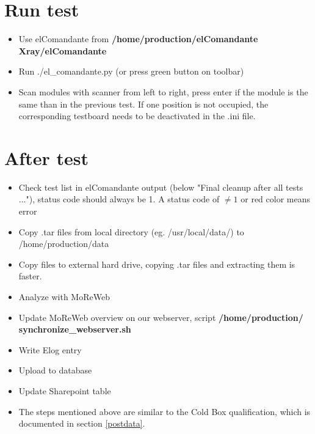 \documentclass[fleqn,10pt]{SelfArx} %
\newcommand{\shellcmd}[1]{\\\indent\indent\texttt{\footnotesize\$ #1}\\}
\begin{document}


\section{Run test}

\begin{itemize}
\item Use elComandante from \textbf{/home/production/elComandante{\color{Red} Xray}/elComandante}
\item Run ./el\_comandante.py (or press green button on toolbar)
\item Scan modules with scanner from left to right, press enter if the module is the same than in the previous test. If one position is not occupied, the corresponding testboard needs to be deactivated in the .ini file.
\end{itemize}


\section{After test}

\begin{itemize}
\item Check test list in elComandante output (below "Final cleanup after all tests ..."), status code should always be 1. A status code of $\neq 1$ or red color means error
\item Copy .tar files from local directory (eg. /usr/local/data/) to /home/production/data
\item Copy files to external hard drive, copying .tar files and extracting them is faster.
\item Analyze with MoReWeb
\item Update MoReWeb overview on our webserver, script \textbf{/home/production/ synchronize\_webserver.sh}
\item Write Elog entry
\item Upload to database
\item Update Sharepoint table
\item The steps mentioned above are similar to the Cold Box qualification, which is documented in section \ref{postdata}.
\end{itemize}
\end{document}
